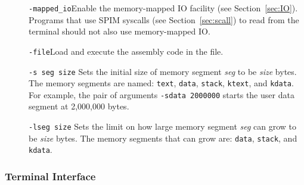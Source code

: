 \documentclass[11pt]{article}
\begin{document}
\begin{description}
  \item [] {\tt -mapped\_io}\newline Enable the memory-mapped IO facility
(see Section~\ref{sec:IO}).  Programs that use SPIM syscalls (see
Section~\ref{sec:scall}) to read from the terminal should not also use
memory-mapped IO.

  \item [] {\tt -file}\newline Load and execute the assembly code in
the file.

  \item [] {\tt -s seg size} Sets the initial size of memory segment
{\em seg\/} to be {\em size\/} bytes.  The memory segments are named:
{\tt text}, {\tt data}, {\tt stack}, {\tt ktext}, and {\tt kdata}.
For example, the pair of arguments {\tt -sdata 2000000} starts the
user data segment at 2,000,000 bytes.

  \item [] {\tt -lseg size} Sets the limit on how large memory segment
{\em seg\/} can grow to be {\em size\/} bytes.  The memory segments
that can grow are: {\tt data}, {\tt stack}, and {\tt kdata}.
\end{description}

\subsubsection{Terminal Interface}
\end{document}
